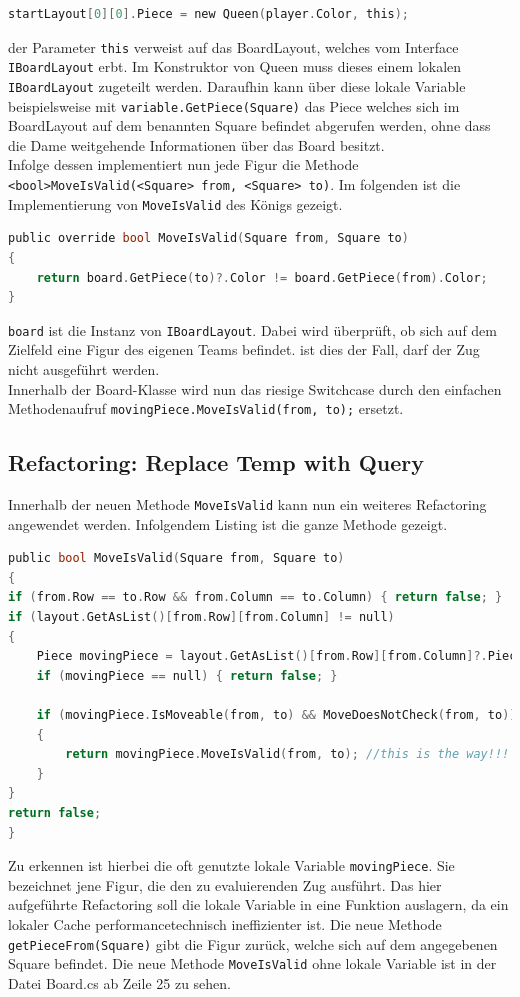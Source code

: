 \documentclass[
10pt, %
a4paper, %
oneside, %
headinclude,footinclude, %
BCOR5mm, %
]{scrartcl}
\begin{document}
\begin{lstlisting}[language=c, style=mStyle]
startLayout[0][0].Piece = new Queen(player.Color, this);
\end{lstlisting}

der Parameter \texttt{this} verweist auf das BoardLayout, welches vom Interface \texttt{IBoardLayout} erbt. Im Konstruktor von Queen muss dieses einem lokalen \texttt{IBoardLayout} zugeteilt werden. Daraufhin kann über diese lokale Variable beispielsweise mit \texttt{variable.GetPiece(Square)} das Piece welches sich im BoardLayout auf dem benannten Square befindet abgerufen werden, ohne dass die Dame weitgehende Informationen über das Board besitzt.\\
Infolge dessen implementiert nun jede Figur die Methode \texttt{<bool>MoveIsValid(<Square> from, <Square> to)}. Im folgenden ist die Implementierung von \texttt{MoveIsValid} des Königs gezeigt.

\begin{lstlisting}[language=c, style=mStyle]
public override bool MoveIsValid(Square from, Square to)
{
	return board.GetPiece(to)?.Color != board.GetPiece(from).Color;
}
\end{lstlisting}

\texttt{board} ist die Instanz von \texttt{IBoardLayout}. Dabei wird überprüft, ob sich auf dem Zielfeld eine Figur des eigenen Teams befindet. ist dies der Fall, darf der Zug nicht ausgeführt werden.\\
Innerhalb der Board-Klasse wird nun das riesige Switchcase durch den einfachen Methodenaufruf \texttt{movingPiece.MoveIsValid(from, to);} ersetzt.

\subsection{Refactoring: Replace Temp with Query}
Innerhalb der neuen Methode \texttt{MoveIsValid} kann nun ein weiteres Refactoring angewendet werden. Infolgendem Listing ist die ganze Methode gezeigt.

\begin{lstlisting}[language=c, style=mStyle]
public bool MoveIsValid(Square from, Square to)
{
if (from.Row == to.Row && from.Column == to.Column) { return false; }
if (layout.GetAsList()[from.Row][from.Column] != null)
{
	Piece movingPiece = layout.GetAsList()[from.Row][from.Column]?.Piece;
	if (movingPiece == null) { return false; }

	if (movingPiece.IsMoveable(from, to) && MoveDoesNotCheck(from, to)) //hehe, codesmell
	{
		return movingPiece.MoveIsValid(from, to); //this is the way!!!                    
	}
}
return false;
}
\end{lstlisting}
Zu erkennen ist hierbei die oft genutzte lokale Variable \texttt{movingPiece}. Sie bezeichnet jene Figur, die den zu evaluierenden Zug ausführt. Das hier aufgeführte Refactoring soll die lokale Variable in eine Funktion auslagern, da ein lokaler Cache performancetechnisch ineffizienter ist. Die neue Methode \texttt{getPieceFrom(Square)} gibt die Figur zurück, welche sich auf dem angegebenen Square befindet. Die neue Methode \texttt{MoveIsValid} ohne lokale Variable ist in der Datei Board.cs ab Zeile 25 zu sehen.
\end{document}
